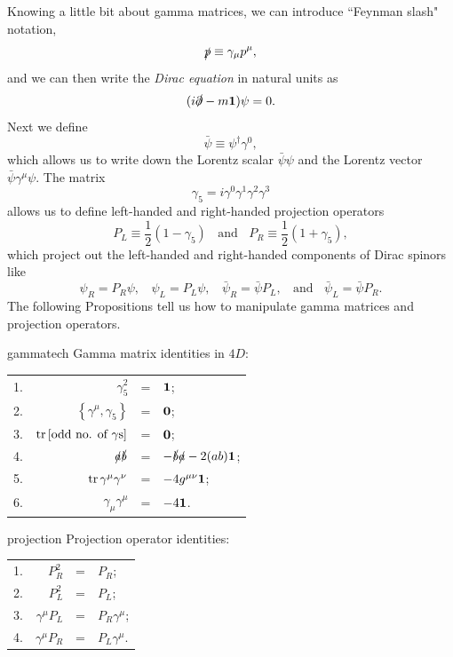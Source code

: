 Knowing a little bit about gamma matrices, we can introduce
``Feynman slash" notation,
\begin{equation}
  \slashed{p}\equiv\gamma_\mu p^\mu,
\end{equation}
and we can then write the {\it Dirac equation} in natural units as
\begin{equation}
  (i\slashed{\partial}-m{\mathbf 1})\psi=0.
\end{equation}
Next we define
\begin{equation}
  \bar{\psi}\equiv\psi^\dagger\gamma^0,
\end{equation}
which allows us to write down the Lorentz scalar $\bar{\psi}\psi$ and
the Lorentz vector $\bar{\psi}\gamma^\mu\psi$. The matrix
\begin{equation}
  \gamma_5=i\gamma^0\gamma^1\gamma^2\gamma^3
\end{equation}
allows us to define left-handed and right-handed projection operators
\begin{equation}\label{eq:projdef}
  P_L\equiv\frac{1}{2}(1-\gamma_5)~~~~\text{and}~~~~
  P_R\equiv\frac{1}{2}(1+\gamma_5),
\end{equation}
which project out the left-handed and right-handed components of Dirac spinors
like
\begin{equation}\label{eq:projact}
  \psi_R=P_R\psi,~~~~
  \psi_L=P_L\psi,~~~~
  \bar{\psi}_R=\bar{\psi}P_L,~~~~\text{and}~~~~
  \bar{\psi}_L=\bar{\psi}P_R.
\end{equation}
The following Propositions tell us how to manipulate gamma matrices and
projection operators.
\begin{proposition}{}{gammatech}
Gamma matrix identities in $4D$:
\begin{center}\begin{tabular}{lrcl}
1. &$\gamma_5^2$ &=& ${\mathbf 1}$;\\
2. &$\left\{\gamma^\mu,\gamma_5\right\}$ &=& ${\mathbf 0}$;\\
3. &$\tr\left[\text{odd no. of $\gamma$s}\right]$ &=& ${\mathbf 0}$;\\
4. &$\slashed{a}\slashed{b}$ &=& $-\slashed{b}\slashed{a}-2(ab){\mathbf 1}$;\\
5. &$\tr\gamma^\mu\gamma^\nu$ &=& $-4g^{\mu\nu}{\mathbf 1}$;\\
6. &$\gamma_\mu\gamma^\mu$&=& $-4{\mathbf 1}$. 
\end{tabular}\end{center}
\end{proposition}
\begin{proposition}{}{projection}
Projection operator identities:
\begin{center}\begin{tabular}{lrcl}
1. & $P_R^2$ &=& $P_R$;\\
2. & $P_L^2$ &=& $P_L$;\\
3. & $\gamma^\mu P_L$ &=& $P_R \gamma^\mu$;\\
4. & $\gamma^\mu P_R$ &=& $P_L \gamma^\mu$.
\end{tabular}\end{center}
\end{proposition}



